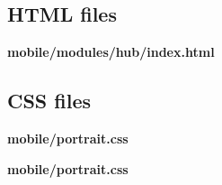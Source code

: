 \subsection{HTML files}

\noindent \textbf{mobile/modules/hub/index.html}


\subsection{CSS files}

\noindent \textbf{mobile/portrait.css}


\noindent \textbf{mobile/portrait.css}
